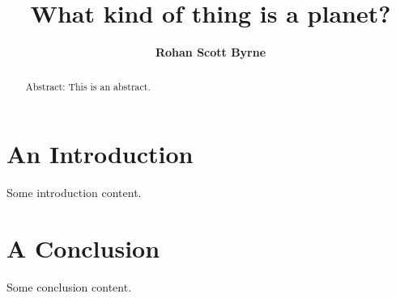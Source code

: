 \documentclass{article}
\title{What kind of thing is a planet?}
\date{\displaydate{articleDate}}
\author{\bfseries Rohan Scott Byrne\mdseries\\}
\begin{document}
\maketitle
\begin{abstract}
Abstract: This is an abstract.
\end{abstract}

\section{An Introduction}

Some introduction content.

\section{A Conclusion}

Some conclusion content.
\end{document}
